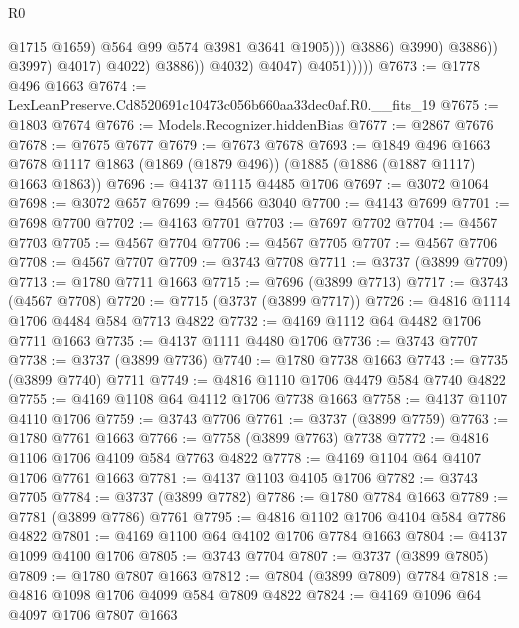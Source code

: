 \begin{lexlean}{R0}
\begin{coremodule}
                                            @1715
                                            @1659)
                                          @564
                                          @99
                                          @574
                                          @3981
                                          @3641
                                          @1905)))
                                    @3886)
                                  @3990)
                                @3886))
                            @3997)
                          @4017)
                        @4022)
                      @3886))
                  @4032)
                @4047)
              @4051)))))
@7673 := @1778 @496 @1663
@7674 := LexLeanPreserve.Cd8520691c10473c056b660aa33dec0af.R0.__fits_19
@7675 := @1803 @7674
@7676 := Models.Recognizer.hiddenBias
@7677 := @2867 @7676
@7678 := @7675 @7677
@7679 := @7673 @7678
@7693 := @1849
    @496
    @1663
    @7678
    @1117
    @1863
    (@1869 (@1879 @496))
    (@1885 (@1886 (@1887 @1117) @1663 @1863))
@7696 := @4137 @1115 @4485 @1706
@7697 := @3072 @1064
@7698 := @3072 @657
@7699 := @4566 @3040
@7700 := @4143 @7699
@7701 := @7698 @7700
@7702 := @4163 @7701
@7703 := @7697 @7702
@7704 := @4567 @7703
@7705 := @4567 @7704
@7706 := @4567 @7705
@7707 := @4567 @7706
@7708 := @4567 @7707
@7709 := @3743 @7708
@7711 := @3737 (@3899 @7709)
@7713 := @1780 @7711 @1663
@7715 := @7696 (@3899 @7713)
@7717 := @3743 (@4567 @7708)
@7720 := @7715 (@3737 (@3899 @7717))
@7726 := @4816 @1114 @1706 @4484 @584 @7713 @4822
@7732 := @4169 @1112 @64 @4482 @1706 @7711 @1663
@7735 := @4137 @1111 @4480 @1706
@7736 := @3743 @7707
@7738 := @3737 (@3899 @7736)
@7740 := @1780 @7738 @1663
@7743 := @7735 (@3899 @7740) @7711
@7749 := @4816 @1110 @1706 @4479 @584 @7740 @4822
@7755 := @4169 @1108 @64 @4112 @1706 @7738 @1663
@7758 := @4137 @1107 @4110 @1706
@7759 := @3743 @7706
@7761 := @3737 (@3899 @7759)
@7763 := @1780 @7761 @1663
@7766 := @7758 (@3899 @7763) @7738
@7772 := @4816 @1106 @1706 @4109 @584 @7763 @4822
@7778 := @4169 @1104 @64 @4107 @1706 @7761 @1663
@7781 := @4137 @1103 @4105 @1706
@7782 := @3743 @7705
@7784 := @3737 (@3899 @7782)
@7786 := @1780 @7784 @1663
@7789 := @7781 (@3899 @7786) @7761
@7795 := @4816 @1102 @1706 @4104 @584 @7786 @4822
@7801 := @4169 @1100 @64 @4102 @1706 @7784 @1663
@7804 := @4137 @1099 @4100 @1706
@7805 := @3743 @7704
@7807 := @3737 (@3899 @7805)
@7809 := @1780 @7807 @1663
@7812 := @7804 (@3899 @7809) @7784
@7818 := @4816 @1098 @1706 @4099 @584 @7809 @4822
@7824 := @4169 @1096 @64 @4097 @1706 @7807 @1663

\end{coremodule}
\end{lexlean}
